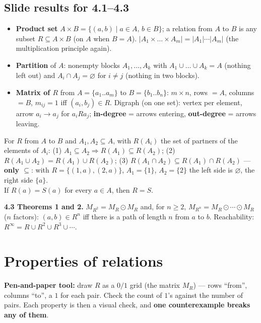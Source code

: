 \documentclass{fkt-notes}
\newcommand{\src}[1]{\par\noindent{\small\itshape Source: #1}\par\smallskip}
\newcommand{\kolman}[1]{\setcounter{section}{\numexpr#1-1\relax}}
\theoremstyle{definition}
\begin{document}
\subsection{Slide results for 4.1--4.3}
%
\begin{itemize}[nosep]
  \item \textbf{Product set}
        $A\times B=\{(a,b)\mid a\in A,\,b\in B\}$; a relation from $A$ to
        $B$ is any subset $R\subseteq A\times B$ (on $A$ when $B=A$).
        $|A_1\times\dots\times A_m|=|A_1|\cdots|A_m|$ (the multiplication
        principle again).
  \item \textbf{Partition} of $A$: nonempty blocks $A_1,\dots,A_k$ with
        $A_1\cup\dots\cup A_k=A$ (nothing left out) and $A_i\cap A_j=\varnothing$
        for $i\ne j$ (nothing in two blocks).
  \item \textbf{Matrix of $R$} from $A=\{a_1..a_m\}$ to $B=\{b_1..b_n\}$:
        $m\times n$, rows $=A$, columns $=B$, $m_{ij}=1$ iff
        $(a_i,b_j)\in R$. Digraph (on one set): vertex per element, arrow
        $a_i\to a_j$ for $a_iRa_j$; \textbf{in-degree} = arrows entering,
        \textbf{out-degree} = arrows leaving.
\end{itemize}
\begin{rulebox}[title={4.2 Theorems 1 and 2}]
  For $R$ from $A$ to $B$ and $A_1,A_2\subseteq A$, with $R(A_i)$ the set of
  partners of the elements of $A_i$:
  (1) $A_1\subseteq A_2\Rightarrow R(A_1)\subseteq R(A_2)$;
  (2) $R(A_1\cup A_2)=R(A_1)\cup R(A_2)$;
  (3) $R(A_1\cap A_2)\subseteq R(A_1)\cap R(A_2)$ --- \textbf{only
    $\subseteq$}: with $R=\{(1,a),(2,a)\}$, $A_1=\{1\}$, $A_2=\{2\}$ the
  left side is $\varnothing$, the right side $\{a\}$.\\
  If $R(a)=S(a)$ for every $a\in A$, then $R=S$.
\end{rulebox}
\begin{rulepar}
  \textbf{4.3 Theorems 1 and 2.} $M_{R^2}=M_R\odot M_R$ and, for
  $n\ge2$, $M_{R^n}=M_R\odot\cdots\odot M_R$ ($n$ factors): $(a,b)\in R^n$
  iff there is a path of length $n$ from $a$ to $b$. Reachability:
  $R^\infty=R\cup R^2\cup R^3\cup\cdots$.
\end{rulepar}

\kolman{4}
\section{Properties of relations}\src{Kolman 4.4; own notes}
%
\textbf{Pen-and-paper tool:} draw $R$ as a $0/1$ grid (the matrix
$M_R$) --- rows ``from'', columns ``to'', a $1$ for each pair. Check
the count of $1$'s against the number of pairs. Each property is then
a visual check, and \textbf{one counterexample breaks any of them}.
\end{document}
